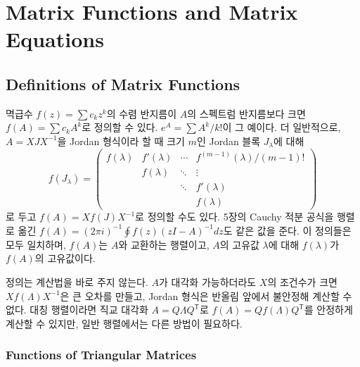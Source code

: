 \chapter{Matrix Functions and Matrix Equations}
\label{ch:matrix-functions}


\section{Definitions of Matrix Functions}
\label{sec:matrix-function-def}

멱급수 $f(z)=\sum c_kz^k$의 수렴 반지름이 $A$의 스펙트럼 반지름보다 크면 $f(A)=\sum c_kA^k$로 정의할 수 있다. $e^A=\sum A^k/k!$이 그 예이다. 더 일반적으로, $A=XJX^{-1}$을 Jordan 형식이라 할 때 크기 $m$인 Jordan 블록 $J_\lambda$에 대해
\[
f(J_\lambda)=\begin{pmatrix}f(\lambda)&f'(\lambda)&\cdots&f^{(m-1)}(\lambda)/(m-1)!\\&f(\lambda)&\ddots&\vdots\\&&\ddots&f'(\lambda)\\&&&f(\lambda)\end{pmatrix}
\]
로 두고 $f(A)=Xf(J)X^{-1}$로 정의할 수도 있다. 5장의 Cauchy 적분 공식을 행렬로 옮긴 $f(A)=(2\pi i)^{-1}\oint f(z)(zI-A)^{-1}dz$도 같은 값을 준다. 이 정의들은 모두 일치하며, $f(A)$는 $A$와 교환하는 행렬이고, $A$의 고유값 $\lambda$에 대해 $f(\lambda)$가 $f(A)$의 고유값이다\cite{higham2008functions}.

정의는 계산법을 바로 주지 않는다. $A$가 대각화 가능하더라도 $X$의 조건수가 크면 $Xf(\Lambda)X^{-1}$은 큰 오차를 만들고, Jordan 형식은 반올림 앞에서 불안정해 계산할 수 없다. 대칭 행렬이라면 직교 대각화 $A=Q\Lambda Q^{\mathsf T}$로 $f(A)=Qf(\Lambda)Q^{\mathsf T}$를 안정하게 계산할 수 있지만, 일반 행렬에서는 다른 방법이 필요하다.

\subsection{Functions of Triangular Matrices}

